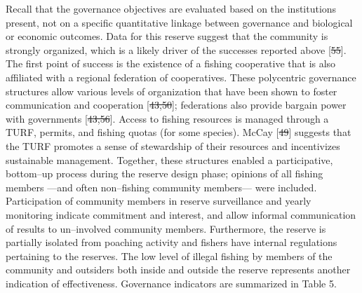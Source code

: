 \documentclass[12pt,]{article}
\providecommand{\DIFaddtex}[1]{{\protect\color{blue}\uwave{#1}}} %
\providecommand{\DIFdeltex}[1]{{\protect\color{red}\sout{#1}}}                      %
\providecommand{\DIFaddbegin}{} %
\providecommand{\DIFaddend}{} %
\providecommand{\DIFdelbegin}{} %
\providecommand{\DIFdelend}{} %
\providecommand{\DIFadd}[1]{\texorpdfstring{\DIFaddtex{#1}}{#1}} %
\providecommand{\DIFdel}[1]{\texorpdfstring{\DIFdeltex{#1}}{}} %
\newcommand{\DIFscaledelfig}{0.5}
\newlength{\DIFdelgraphicswidth} %
\newlength{\DIFdelgraphicsheight} %
\newcommand{\DIFaddincludegraphics}[2][]{{\color{blue}\fbox{\DIFOincludegraphics[#1]{#2}}}} %
\newcommand{\DIFdelincludegraphics}[2][]{%
\sbox{\DIFdelgraphicsbox}{\DIFOincludegraphics[#1]{#2}}%
\settoboxwidth{\DIFdelgraphicswidth}{\DIFdelgraphicsbox} %
\settoboxtotalheight{\DIFdelgraphicsheight}{\DIFdelgraphicsbox} %
\scalebox{\DIFscaledelfig}{%
\parbox[b]{\DIFdelgraphicswidth}{\usebox{\DIFdelgraphicsbox}\\[-\baselineskip] \rule{\DIFdelgraphicswidth}{0em}}\llap{\resizebox{\DIFdelgraphicswidth}{\DIFdelgraphicsheight}{%
\setlength{\unitlength}{\DIFdelgraphicswidth}%
\begin{picture}(1,1)%
\thicklines\linethickness{2pt} %
{\color[rgb]{1,0,0}\put(0,0){\framebox(1,1){}}}%
{\color[rgb]{1,0,0}\put(0,0){\line( 1,1){1}}}%
{\color[rgb]{1,0,0}\put(0,1){\line(1,-1){1}}}%
\end{picture}%
}\hspace*{3pt}}} %
} %
\DeclareRobustCommand{\DIFaddbegin}{\DIFOaddbegin \let\includegraphics\DIFaddincludegraphics} %
\DeclareRobustCommand{\DIFaddend}{\DIFOaddend \let\includegraphics\DIFOincludegraphics} %
\DeclareRobustCommand{\DIFdelbegin}{\DIFOdelbegin \let\includegraphics\DIFdelincludegraphics} %
\DeclareRobustCommand{\DIFdelend}{\DIFOaddend \let\includegraphics\DIFOincludegraphics} %
\begin{document}
Recall that the governance objectives are evaluated based on the
institutions present, not on a specific quantitative linkage between
governance and biological or economic outcomes. Data for this reserve
suggest that the community is strongly organized, which is a likely
driver of the successes reported above {[}\DIFdelbegin \DIFdel{55}\DIFdelend \DIFaddbegin \DIFadd{60}\DIFaddend {]}. The first point of
success is the existence of a fishing cooperative that is also
affiliated with a regional federation of cooperatives. These polycentric
governance structures allow various levels of organization that have
been shown to foster communication and cooperation {[}\DIFdelbegin \DIFdel{43,50}\DIFdelend \DIFaddbegin \DIFadd{49,56}\DIFaddend {]};
federations also provide bargain power with governments {[}\DIFdelbegin \DIFdel{43,56}\DIFdelend \DIFaddbegin \DIFadd{49,61}\DIFaddend {]}.
Access to fishing resources is managed through a TURF, permits, and
fishing quotas (for some species). McCay {[}\DIFdelbegin \DIFdel{49}\DIFdelend \DIFaddbegin \DIFadd{55}\DIFaddend {]} suggests that the TURF
promotes a sense of stewardship of their resources and incentivizes
sustainable management. Together, these structures enabled a
participative, bottom--up process during the reserve design phase;
opinions of all fishing members ---and often non--fishing community
members--- were included. Participation of community members in reserve
surveillance and yearly monitoring indicate commitment and interest, and
allow informal communication of results to un--involved community
members. Furthermore, the reserve is partially isolated from poaching
activity and fishers have internal regulations pertaining to the
reserves. The low level of illegal fishing by members of the community
and outsiders both inside and outside the reserve represents another
indication of effectiveness. Governance indicators are summarized in
Table 5.
\end{document}

